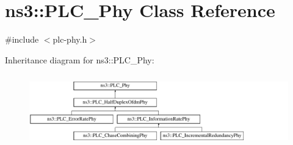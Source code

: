 \hypertarget{classns3_1_1PLC__Phy}{\section{ns3\-:\-:\-P\-L\-C\-\_\-\-Phy \-Class \-Reference}
\label{classns3_1_1PLC__Phy}
}


{\ttfamily \#include $<$plc-\/phy.\-h$>$}

\-Inheritance diagram for ns3\-:\-:\-P\-L\-C\-\_\-\-Phy\-:\begin{figure}[H]
\begin{center}
\leavevmode
\includegraphics[height=3.177305cm]{classns3_1_1PLC__Phy}
\end{center}
\end{figure}
